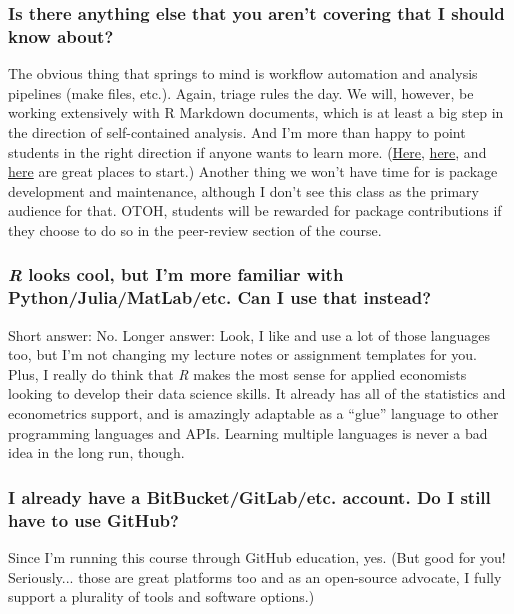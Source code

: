 \documentclass[12]{article}
\begin{document}
\vspace{-0.25cm}
\subsubsection*{Is there anything else that you aren't covering that I should know about?}
The obvious thing that springs to mind is workflow automation and analysis pipelines (make files, etc.). Again, triage rules the day. We will, however, be working extensively with R Markdown documents, which is at least a big step in the direction of self-contained analysis. And I'm more than happy to point students in the right direction if anyone wants to learn more. (\href{http://stat545.com/Classroom/notes/cm109.nb.html}{Here}, \href{https://ropenscilabs.github.io/drake-manual/index.html}{here}, and \href{https://web.stanford.edu/~gentzkow/research/CodeAndData.pdf}{here} are great places to start.) Another thing we won't have time for is package development and maintenance, although I don't see this class as the primary audience for that. OTOH, students will be rewarded for package contributions if they choose to do so in the peer-review section of the course. 

\vspace{-0.25cm}
\subsubsection*{\textit{R} looks cool, but I'm more familiar with Python/Julia/MatLab/etc. Can I use that instead?}
Short answer: No. Longer answer: Look, I like and use a lot of those languages too, but I'm not changing my lecture notes or assignment templates for you. Plus, I really do think that \textit{R} makes the most sense for applied economists looking to develop their data science skills. It already has all of the statistics and econometrics support, and is amazingly adaptable as a ``glue'' language to other programming languages and APIs. Learning multiple languages is never a bad idea in the long run, though.

\vspace{-0.25cm}
\subsubsection*{I already have a BitBucket/GitLab/etc. account. Do I still have to use GitHub?}
Since I'm running this course through GitHub education, yes. (But good for you! Seriously... those are great platforms too and as an open-source advocate, I fully support a plurality of tools and software options.)
\end{document}
